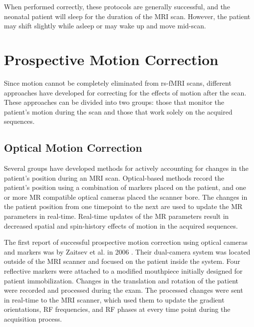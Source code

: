 When performed correctly, these protocols are generally successful, and the neonatal patient will sleep for the duration of the MRI scan. However, the patient may shift slightly while asleep or may wake up and move mid-scan.


\section{Prospective Motion Correction}

Since motion cannot be completely eliminated from rs-fMRI scans, different approaches have developed for correcting for the effects of motion after the scan. These approaches can be divided into two groups: those that monitor the patient's motion during the scan and those that work solely on the acquired sequences.

\subsection{Optical Motion Correction}

Several groups have developed methods for actively accounting for changes in the patient's position during an MRI scan. Optical-based methods record the patient's position using a combination of markers placed on the patient, and one or more MR compatible optical cameras placed the scanner bore. The changes in the patient position from one timepoint to the next are used to update the MR parameters in real-time. Real-time updates of the MR parameters result in decreased spatial and spin-history effects of motion in the acquired sequences.

The first report of successful prospective motion correction using optical cameras and markers was by Zaitsev et al. in 2006 \cite{Zaitsev2006}. Their dual-camera system was located outside of the MRI scanner and focused on the patient inside the system. Four reflective markers were attached to a modified mouthpiece initially designed for patient immobilization. Changes in the translation and rotation of the patient were recorded and processed during the exam. The processed changes were sent in real-time to the MRI scanner, which used them to update the gradient orientations, RF frequencies, and RF phases at every time point during the acquisition process.

